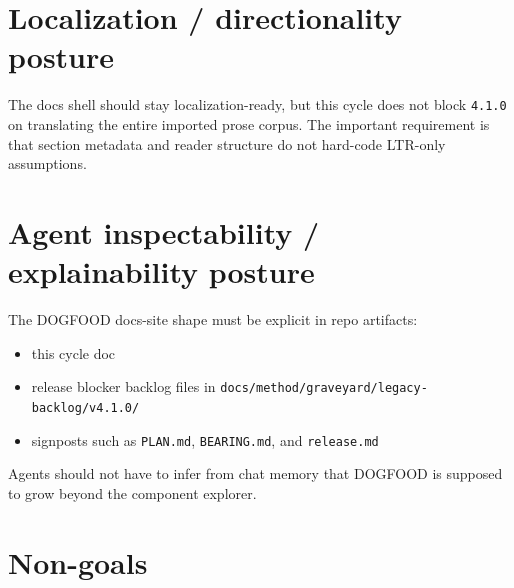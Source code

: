 \section{Localization / directionality posture}\label{record-082-localization-directionality-posture}

The docs shell should stay localization-ready, but this cycle does not block \texttt{4\allowbreak{}.\allowbreak{}1\allowbreak{}.\allowbreak{}0} on translating the entire imported prose corpus. The important requirement is that section metadata and reader structure do not hard-code LTR-only assumptions.

\section{Agent inspectability / explainability posture}\label{record-082-agent-inspectability-explainability-posture}

The DOGFOOD docs-site shape must be explicit in repo artifacts:

\begin{itemize}
\tightlist
\item
  this cycle doc
\item
  release blocker backlog files in \texttt{d\allowbreak{}o\allowbreak{}c\allowbreak{}s\allowbreak{}/\allowbreak{}m\allowbreak{}e\allowbreak{}t\allowbreak{}h\allowbreak{}o\allowbreak{}d\allowbreak{}/\allowbreak{}g\allowbreak{}r\allowbreak{}a\allowbreak{}v\allowbreak{}e\allowbreak{}y\allowbreak{}a\allowbreak{}r\allowbreak{}d\allowbreak{}/\allowbreak{}l\allowbreak{}e\allowbreak{}g\allowbreak{}a\allowbreak{}c\allowbreak{}y\allowbreak{}-\allowbreak{}b\allowbreak{}a\allowbreak{}c\allowbreak{}k\allowbreak{}l\allowbreak{}o\allowbreak{}g\allowbreak{}/\allowbreak{}v\allowbreak{}4\allowbreak{}.\allowbreak{}1\allowbreak{}.\allowbreak{}0\allowbreak{}/}
\item
  signposts such as \texttt{P\allowbreak{}L\allowbreak{}A\allowbreak{}N\allowbreak{}.\allowbreak{}m\allowbreak{}d}, \texttt{B\allowbreak{}E\allowbreak{}A\allowbreak{}R\allowbreak{}I\allowbreak{}N\allowbreak{}G\allowbreak{}.\allowbreak{}m\allowbreak{}d}, and \texttt{r\allowbreak{}e\allowbreak{}l\allowbreak{}e\allowbreak{}a\allowbreak{}s\allowbreak{}e\allowbreak{}.\allowbreak{}m\allowbreak{}d}
\end{itemize}

Agents should not have to infer from chat memory that DOGFOOD is supposed to grow beyond the component explorer.

\section{Non-goals}\label{record-082-non-goals}

